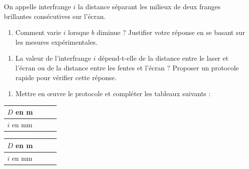 \documentclass[a4paper,11pt,fleqn]{article}%
\begin{document}
\vspace{1em}
On appelle interfrange $i$ la distance séparant les milieux de deux franges brillantes consécutives sur l'écran.
\begin{enumerate}[resume]
    \item Comment varie $i$ lorsque $b$ diminue ? Justifier votre réponse en se basant sur les mesures expérimentales.
\end{enumerate}


\noindent
\fbox{\begin{minipage}{\linewidth}
\vspace{2.5cm}
\hspace{3cm}
\end{minipage}}

\vspace{1em}
\begin{enumerate}[resume]
    \item La valeur de l'interfrange $i$ dépend-t-elle de la distance entre le laser et l'écran ou de la distance entre les fentes et l'écran ? Proposer un protocole rapide pour vérifier cette réponse.
\end{enumerate}

\noindent
\fbox{\begin{minipage}{\linewidth}
\vspace{2cm}
\hspace{3cm}
\end{minipage}}

\vspace{1em}
\begin{enumerate}[resume]
    \item Mettre en \oe uvre le protocole et compléter les tableaux suivants :
\end{enumerate}

\begin{center}
\begin{tabular}{|>{\centering}m{1.7cm}|>{\centering}m{1.7cm}|>{\centering}m{1.7cm}|>{\centering\arraybackslash}m{1.7cm}|}
    \hline $D$ en m &   &  & \rule[1cm]{0cm}{0cm}\\
    \hline $i$ en mm & & & \rule[1cm]{0cm}{0cm}\\ \hline
\end{tabular}
\begin{tabular}{|>{\centering}m{1.7cm}|>{\centering}m{1.7cm}|>{\centering}m{1.7cm}|>{\centering\arraybackslash}m{1.7cm}|}
    \hline $D$ en m &   &  & \rule[1cm]{0cm}{0cm}\\
    \hline $i$ en mm & & & \rule[1cm]{0cm}{0cm}\\ \hline
\end{tabular}
\end{center}
\end{document}
